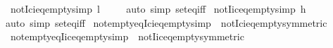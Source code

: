 \begin{isabellebody}
\endisatagproof
{\isafoldproof}%
%
\isadelimproof
\isanewline
%
\endisadelimproof
\isanewline
{}\isamarkupfalse%
\ not{\isacharunderscore}{\kern0pt}Ici{\isacharunderscore}{\kern0pt}eq{\isacharunderscore}{\kern0pt}empty{\isacharbrackleft}{\kern0pt}simp{\isacharbrackright}{\kern0pt}{\isacharcolon}{\kern0pt}\ {\isachardoublequoteopen}{\isacharbraceleft}{\kern0pt}l{\isachardot}{\kern0pt}{\isachardot}{\kern0pt}{\isacharbraceright}{\kern0pt}\ {\isasymnoteq}\ {\isacharbraceleft}{\kern0pt}{\isacharbraceright}{\kern0pt}{\isachardoublequoteclose}\isanewline
%
\isadelimproof
\ \ %
\endisadelimproof
%
\isatagproof
{}\isamarkupfalse%
{\isacharparenleft}{\kern0pt}auto\ simp{\isacharcolon}{\kern0pt}\ set{\isacharunderscore}{\kern0pt}eq{\isacharunderscore}{\kern0pt}iff{\isacharparenright}{\kern0pt}%
\endisatagproof
{\isafoldproof}%
%
\isadelimproof
\isanewline
%
\endisadelimproof
\isanewline
{}\isamarkupfalse%
\ not{\isacharunderscore}{\kern0pt}Iic{\isacharunderscore}{\kern0pt}eq{\isacharunderscore}{\kern0pt}empty{\isacharbrackleft}{\kern0pt}simp{\isacharbrackright}{\kern0pt}{\isacharcolon}{\kern0pt}\ {\isachardoublequoteopen}{\isacharbraceleft}{\kern0pt}{\isachardot}{\kern0pt}{\isachardot}{\kern0pt}h{\isacharbraceright}{\kern0pt}\ {\isasymnoteq}\ {\isacharbraceleft}{\kern0pt}{\isacharbraceright}{\kern0pt}{\isachardoublequoteclose}\isanewline
%
\isadelimproof
\ \ %
\endisadelimproof
%
\isatagproof
{}\isamarkupfalse%
{\isacharparenleft}{\kern0pt}auto\ simp{\isacharcolon}{\kern0pt}\ set{\isacharunderscore}{\kern0pt}eq{\isacharunderscore}{\kern0pt}iff{\isacharparenright}{\kern0pt}%
\endisatagproof
{\isafoldproof}%
%
\isadelimproof
\isanewline
%
\endisadelimproof
\isanewline
{}\isamarkupfalse%
\ not{\isacharunderscore}{\kern0pt}empty{\isacharunderscore}{\kern0pt}eq{\isacharunderscore}{\kern0pt}Ici{\isacharunderscore}{\kern0pt}eq{\isacharunderscore}{\kern0pt}empty{\isacharbrackleft}{\kern0pt}simp{\isacharbrackright}{\kern0pt}\ {\isacharequal}{\kern0pt}\ not{\isacharunderscore}{\kern0pt}Ici{\isacharunderscore}{\kern0pt}eq{\isacharunderscore}{\kern0pt}empty{\isacharbrackleft}{\kern0pt}symmetric{\isacharbrackright}{\kern0pt}\isanewline
{}\isamarkupfalse%
\ not{\isacharunderscore}{\kern0pt}empty{\isacharunderscore}{\kern0pt}eq{\isacharunderscore}{\kern0pt}Iic{\isacharunderscore}{\kern0pt}eq{\isacharunderscore}{\kern0pt}empty{\isacharbrackleft}{\kern0pt}simp{\isacharbrackright}{\kern0pt}\ {\isacharequal}{\kern0pt}\ not{\isacharunderscore}{\kern0pt}Iic{\isacharunderscore}{\kern0pt}eq{\isacharunderscore}{\kern0pt}empty{\isacharbrackleft}{\kern0pt}symmetric{\isacharbrackright}{\kern0pt}\isanewline

\end{isabellebody}
